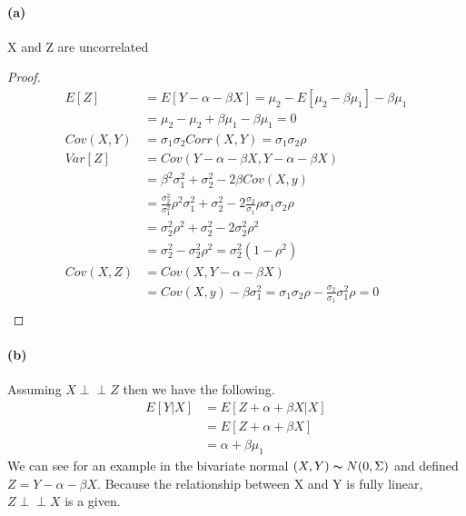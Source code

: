 \documentclass[11pt, letterpaper]{article}
\newcommand{\indep}{\perp \!\!\! \perp}
\begin{document}
\paragraph{(a)} X and Z are uncorrelated
\begin{proof}\begin{align*}
    E[Z] &= E[Y- \alpha - \beta X] = \mu_2 - E[\mu_2 - \beta \mu_1] - \beta \mu_1 \\
        &= \mu_2 - \mu_2 + \beta \mu_1 - \beta \mu_1 = 0 \\
    Cov(X, Y) &= \sigma_1 \sigma_2 Corr(X, Y) = \sigma_1 \sigma_2 \rho \\
    Var[Z] &= Cov(Y-\alpha-\beta X, Y-\alpha-\beta X) \\
        &= \beta^2 \sigma^2_1 + \sigma^2_2 - 2\beta Cov(X, y) \\
        &= \frac{\sigma_2^2}{\sigma^2_1}\rho^2 \sigma^2_1 + \sigma^2_2 - 2\frac{\sigma_2}{\sigma_1}\rho \sigma_1 \sigma_2 \rho \\
        &= \sigma_2^2 \rho^2 + \sigma_2^2 - 2\sigma^2_2 \rho^2 \\
        &= \sigma^2_2 - \sigma^2_2 \rho^2 = \sigma^2_2 (1-\rho^2) \\
    Cov(X, Z) &= Cov(X, Y - \alpha - \beta X) \\
        &= Cov(X, y) - \beta \sigma^2_1 = \sigma_1 \sigma_2 \rho - \frac{\sigma_2}{\sigma_1}\sigma_1^2 \rho = 0\\
\end{align*}\end{proof}

\paragraph{(b)} Assuming $X \indep Z$ then we have the following.
\begin{align*}
    E[Y|X] &= E[Z + \alpha + \beta X | X] \\
        &= E[Z + \alpha + \beta X] \\
        &= \alpha + \beta \mu_1
\end{align*}
We can see for an example in the bivariate normal $(X, Y) \thicksim N(0, \Sigma)$ and defined $Z = Y - \alpha - \beta X$. Because the relationship between X and Y is fully linear, $Z \indep X$ is a given.
\end{document}
